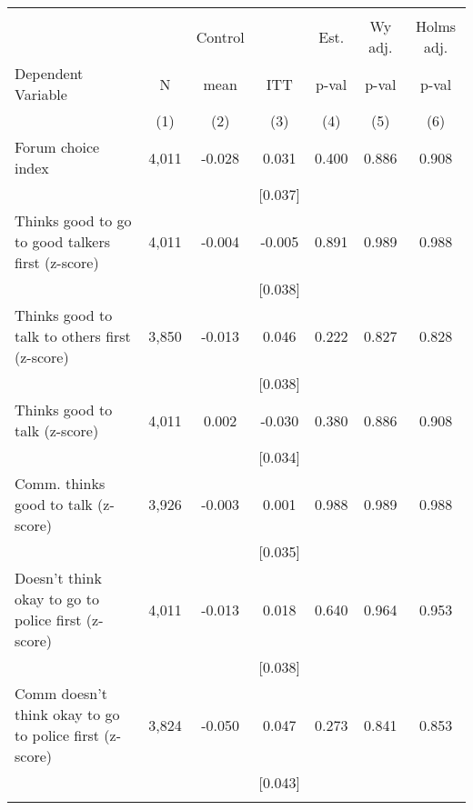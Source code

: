 \begin{tabular}{lcccccc}
\hline \noalign{\smallskip} &  &  &  &  &  & \\
 &  & Control &  & Est. & Wy adj. & Holms adj.\\
Dependent Variable & N & mean & ITT & p-val & p-val & p-val\\
 & (1) & (2) & (3) & (4) & (5) & (6)\\
\noalign{\smallskip}\hline \noalign{\smallskip}Forum choice index & 4,011 & -0.028 & 0.031 & 0.400 & 0.886 & 0.908\\
 &  &  & [0.037] &  &  & \\
\quad Thinks good to go to good talkers first (z-score) & 4,011 & -0.004 & -0.005 & 0.891 & 0.989 & 0.988\\
 &  &  & [0.038] &  &  & \\
\quad Thinks good to talk to others first (z-score) & 3,850 & -0.013 & 0.046 & 0.222 & 0.827 & 0.828\\
 &  &  & [0.038] &  &  & \\
\quad Thinks good to talk (z-score) & 4,011 & 0.002 & -0.030 & 0.380 & 0.886 & 0.908\\
 &  &  & [0.034] &  &  & \\
\quad Comm. thinks good to talk (z-score) & 3,926 & -0.003 & 0.001 & 0.988 & 0.989 & 0.988\\
 &  &  & [0.035] &  &  & \\
\quad Doesn't think okay to go to police first (z-score) & 4,011 & -0.013 & 0.018 & 0.640 & 0.964 & 0.953\\
 &  &  & [0.038] &  &  & \\
\quad Comm doesn't think okay to go to police first (z-score) & 3,824 & -0.050 & 0.047 & 0.273 & 0.841 & 0.853\\
 &  &  & [0.043] &  &  & \\
\noalign{\smallskip}\hline\end{tabular}
